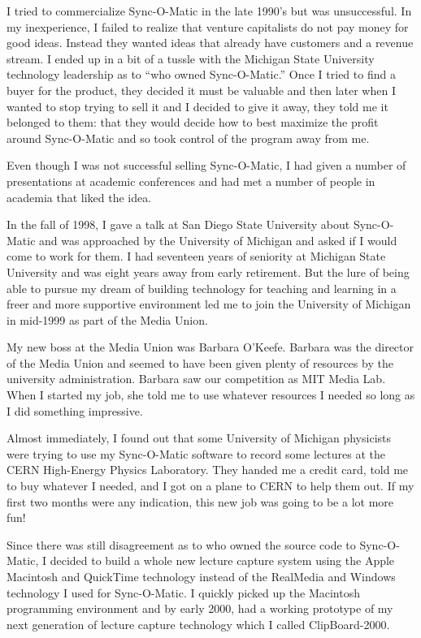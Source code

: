 \documentclass[12pt]{book}
\begin{document}
I tried to commercialize Sync-O-Matic in the late 1990's but was
unsuccessful.  In my inexperience, I failed to realize that venture
capitalists do not pay money for good ideas.  Instead they wanted
ideas that already have customers and a revenue stream.  I ended
up in a bit of a tussle with the Michigan State University technology
leadership as to ``who owned Sync-O-Matic.''  Once I tried to find
a buyer for the product, they decided it must be valuable and then later
when I wanted to stop trying to sell it and I decided to give it away, they told
me it belonged to them:  that they would decide how to best maximize
the profit around Sync-O-Matic and so took control of the program away
from me.

Even though I was not successful selling Sync-O-Matic, I had
given a number of presentations at academic conferences and
had met a number of people in academia that liked the idea.

In the fall of 1998, I gave a talk at San Diego State University
about Sync-O-Matic and was approached by the University of Michigan
and asked if I would come to work for them.  I had seventeen years
of seniority at Michigan State University and was eight years away
from early retirement.  But the lure of being able to pursue
my dream of building technology for teaching and learning in a
freer and more supportive environment led me to join the University
of Michigan in mid-1999 as part of the Media Union.

My new boss at the Media Union was Barbara O'Keefe.
Barbara was the director of the Media Union and seemed to have been
given plenty of resources by
the university administration.  Barbara saw our competition as
MIT Media Lab.  When I started my job, she told me
to use whatever resources I needed so long as I did
something impressive.

Almost immediately, I found out that some University
of Michigan physicists were trying to use my Sync-O-Matic software
to record some lectures at the CERN High-Energy Physics Laboratory.
They handed me a credit card, told me to buy whatever I needed,
and I got on a plane to CERN to help them out.
If my first two months were any indication, this new job
was going to be a lot more fun!

Since there was still disagreement as to who owned the source code to
Sync-O-Matic, I decided to build a whole new lecture capture system
using the Apple Macintosh and QuickTime technology instead of the RealMedia
and Windows technology I used for Sync-O-Matic.  I quickly picked
up the Macintosh programming environment and by early 2000,
had a working prototype of my next generation of lecture capture
technology which I called ClipBoard-2000.
\end{document}
